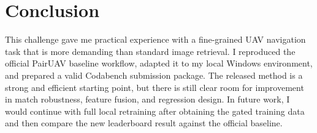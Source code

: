 \documentclass[sigconf]{acmart}
\begin{document}
\section{Conclusion}
This challenge gave me practical experience with a fine-grained UAV navigation task that is more demanding than standard image retrieval. I reproduced the official PairUAV baseline workflow, adapted it to my local Windows environment, and prepared a valid Codabench submission package. The released method is a strong and efficient starting point, but there is still clear room for improvement in match robustness, feature fusion, and regression design. In future work, I would continue with full local retraining after obtaining the gated training data and then compare the new leaderboard result against the official baseline.



\end{document}
